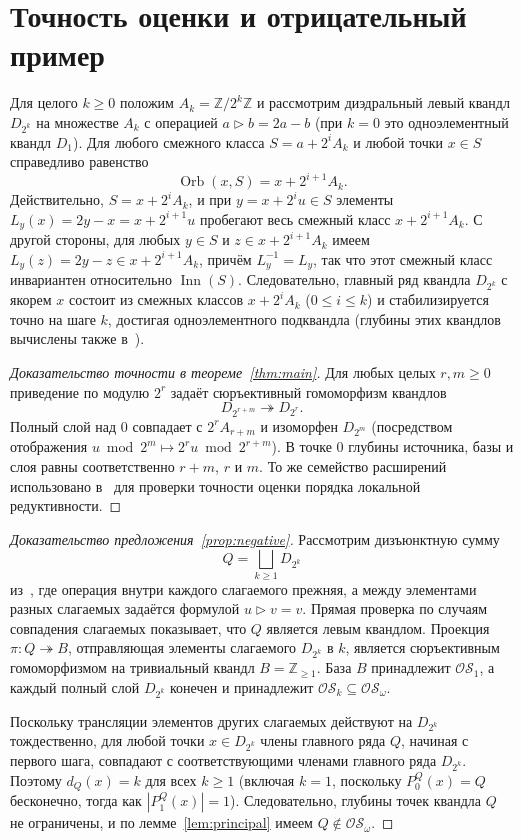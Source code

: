 \documentclass[11pt,a4paper]{article}
\theoremstyle{remark}
\newcommand{\OS}{\mathcal{OS}}
\newcommand{\Inn}{\operatorname{Inn}}
\newcommand{\Orb}{\operatorname{Orb}}
\newcommand{\Z}{\mathbb{Z}}
\newcommand{\conj}{\triangleright}
\begin{document}
\section{Точность оценки и отрицательный пример}\label{sec:negative}

Для целого \(k\ge 0\) положим \(A_k=\Z/2^k\Z\) и рассмотрим диэдральный
левый квандл \(D_{2^k}\) на множестве \(A_k\) с операцией
\(a\conj b=2a-b\) (при \(k=0\) это одноэлементный квандл \(D_1\)).
Для любого смежного класса \(S=a+2^i A_k\) и любой точки \(x\in S\)
справедливо равенство
\[
  \Orb(x,S)=x+2^{i+1}A_k.
\]
Действительно, \(S=x+2^i A_k\), и при \(y=x+2^i u\in S\) элементы
\(L_y(x)=2y-x=x+2^{i+1}u\) пробегают весь смежный класс \(x+2^{i+1}A_k\).
С другой стороны, для любых \(y\in S\) и \(z\in x+2^{i+1}A_k\) имеем
\(L_y(z)=2y-z\in x+2^{i+1}A_k\), причём \(L_y^{-1}=L_y\), так что этот
смежный класс инвариантен относительно \(\Inn(S)\). Следовательно,
главный ряд квандла \(D_{2^k}\) с якорем \(x\) состоит из смежных
классов \(x+2^i A_k\) (\(0\le i\le k\)) и стабилизируется точно на шаге
\(k\), достигая одноэлементного подквандла (глубины этих квандлов
вычислены также в~\cite[пример~4.1]{BCNW}).

\begin{proof}[Доказательство точности в теореме~\ref{thm:main}]
Для любых целых \(r,m\ge 0\) приведение по модулю \(2^r\) задаёт
сюръективный гомоморфизм квандлов
\[
  D_{2^{r+m}}\twoheadrightarrow D_{2^r}.
\]
Полный слой над \(0\) совпадает с \(2^r A_{r+m}\) и изоморфен
\(D_{2^m}\) (посредством отображения
\(u\bmod 2^m\mapsto 2^r u\bmod 2^{r+m}\)). В точке \(0\) глубины
источника, базы и слоя равны соответственно \(r+m\), \(r\) и \(m\).
То же семейство расширений использовано в~\cite[после следствия~5.20]{BCNW}
для проверки точности оценки порядка локальной редуктивности.
\end{proof}

\begin{proof}[Доказательство предложения~\ref{prop:negative}]
Рассмотрим дизъюнктную сумму
\[
  Q=\bigsqcup_{k\ge 1}D_{2^k}
\]
из~\cite[пример~4.2]{BCNW}, где операция внутри каждого слагаемого
прежняя, а между элементами разных слагаемых задаётся формулой
\(u\conj v=v\). Прямая проверка по случаям совпадения слагаемых
показывает, что \(Q\) является левым квандлом. Проекция
\(\pi\colon Q\twoheadrightarrow B\), отправляющая элементы слагаемого
\(D_{2^k}\) в \(k\), является сюръективным гомоморфизмом на тривиальный
квандл \(B=\Z_{\ge 1}\). База \(B\) принадлежит \(\OS_1\), а каждый
полный слой \(D_{2^k}\) конечен и принадлежит \(\OS_k\subseteq\OS_\omega\).

Поскольку трансляции элементов других слагаемых действуют на
\(D_{2^k}\) тождественно, для любой точки \(x\in D_{2^k}\) члены
главного ряда \(Q\), начиная с первого шага, совпадают с
соответствующими членами главного ряда \(D_{2^k}\). Поэтому \(d_Q(x)=k\)
для всех \(k\ge 1\) (включая \(k=1\), поскольку \(P_0^Q(x)=Q\)
бесконечно, тогда как \(|P_1^Q(x)|=1\)). Следовательно, глубины точек
квандла \(Q\) не ограничены, и по лемме~\ref{lem:principal} имеем
\(Q\notin\OS_\omega\).
\end{proof}
\end{document}

